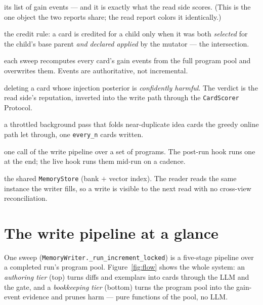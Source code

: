 \documentclass[11pt]{article}
\newcommand{\code}[1]{\texttt{\small #1}}
\begin{document}
\begin{description}[leftmargin=1.4em, itemsep=1.5pt, parsep=0pt, style=unboxed]
    its list of gain events --- and it is exactly what the read side scores. (This
    is the one object the two reports share; the read report colors it identically.)
  \item[\textcolor{evgreen}{Use-attribution}] the credit rule: a card is credited
    for a child only when it was both \emph{selected} for the child's base parent
    \emph{and} \emph{declared applied} by the mutator --- the intersection.
  \item[\textcolor{evgreen}{Restamp}] each sweep recomputes every card's gain
    events from the full program pool and overwrites them. Events are
    authoritative, not incremental.
  \item[\textcolor{harmred}{Harm eviction}] deleting a card whose injection
    posterior is \emph{confidently harmful}. The verdict is the read side's
    reputation, inverted into the write path through the \code{CardScorer}
    Protocol.
  \item[\textcolor{cardblue}{Consolidation}] a throttled background pass that
    folds near-duplicate idea cards the greedy online path let through, one
    \code{every\_n} cards written.
  \item[\textcolor{cardblue}{Sweep / increment}] one call of the write pipeline
    over a set of programs. The post-run hook runs one at the end; the live hook
    runs them mid-run on a cadence.
  \item[\textcolor{cardblue}{Store}] the shared \code{MemoryStore} (bank $+$ vector
    index). The reader reads the same instance the writer fills, so a write is
    visible to the next read with no cross-view reconciliation.
\end{description}
\endgroup

\section{The write pipeline at a glance}
\label{sec:glance}

One sweep (\code{MemoryWriter.\_run\_increment\_locked}) is a five-stage pipeline
over a completed run's program pool. Figure~\ref{fig:flow} shows the whole
system: an \emph{authoring tier} (top) turns diffs and exemplars into cards
through the LLM and the gate, and a \emph{bookkeeping tier} (bottom) turns the
program pool into the gain-event evidence and prunes harm --- pure functions of
the pool, no LLM.
\end{document}
